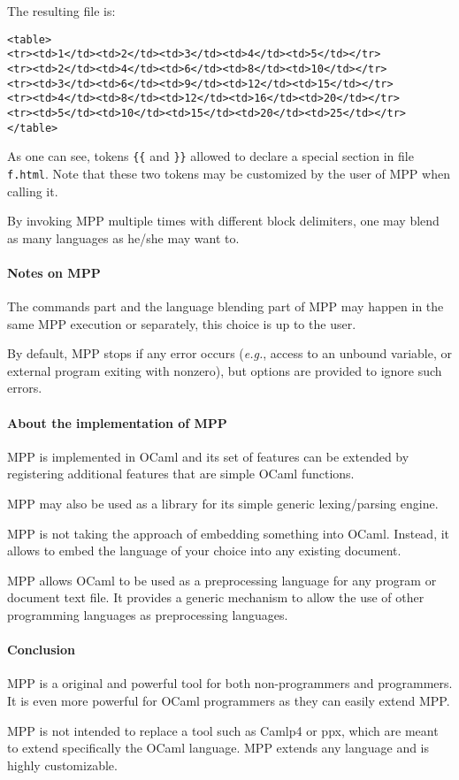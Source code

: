 \documentclass[a4paper]{article}
\def\eg{\emph{e.g.}}
\begin{document}
The resulting file is:
\begin{lstlisting}
<table>
<tr><td>1</td><td>2</td><td>3</td><td>4</td><td>5</td></tr>
<tr><td>2</td><td>4</td><td>6</td><td>8</td><td>10</td></tr>
<tr><td>3</td><td>6</td><td>9</td><td>12</td><td>15</td></tr>
<tr><td>4</td><td>8</td><td>12</td><td>16</td><td>20</td></tr>
<tr><td>5</td><td>10</td><td>15</td><td>20</td><td>25</td></tr>
</table>
\end{lstlisting}

As one  can see, tokens \verb+{{+  and \verb+}}+ allowed  to declare a
special section  in file \texttt{f.html}.  Note that  these two tokens
may be customized by the user of MPP when calling it.

By invoking MPP multiple times with different block delimiters, one
may blend as many languages as he/she may want to.

\paragraph{Notes on MPP}
The commands part and the language  blending part of MPP may happen in
the same MPP execution or separately, this choice is up to the user.

By default, MPP stops if any error occurs (\eg, access to an unbound
variable, or external program exiting with nonzero), but options are
provided to ignore such errors.

\paragraph{About the implementation of MPP}
MPP is implemented in OCaml and its set of features can be extended by
registering additional features that are simple OCaml functions.

MPP may also be used as a library for its simple generic lexing/parsing
engine.

MPP is not taking the approach of embedding something into OCaml. Instead,
it allows to embed the language of your choice into any existing document.

MPP  allows OCaml  to  be used  as  a preprocessing  language for  any
program  or document  text file.  It provides  a generic  mechanism to
allow  the  use  of   other  programming  languages  as  preprocessing
languages.


\paragraph{Conclusion}
MPP is a original and powerful tool for both non-programmers and
programmers.  It is even more powerful for OCaml programmers as they
can easily extend MPP. 

MPP is not intended to replace a tool such as Camlp4 or ppx, which
are meant to extend specifically the OCaml language. MPP extends
any language and is highly customizable.
\end{document}
